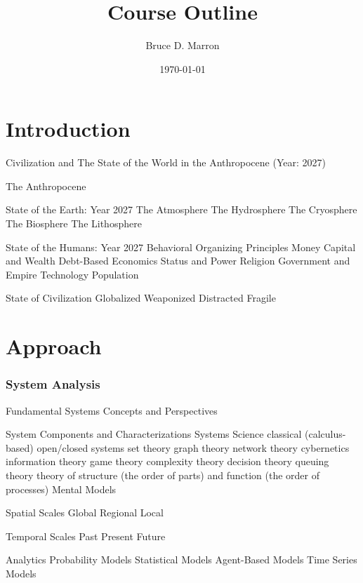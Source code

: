 \documentclass[12pt, letterpaper]{article}
\title{\vspace{-15mm}\fontsize{14pt}{10pt}
                    \selectfont \textbf{Course Outline}   %
                    \vspace{-7mm}
      }
\author{
     \normalsize Bruce D. Marron \\                     %
     \vspace{-5mm}
}
\date{\normalsize \today}
\begin{document}
\begin{singlespacing}
\maketitle                                      %
\end{singlespacing}
\thispagestyle{fancy}                           %


\section{Introduction}
Civilization and The State of the World in the Anthropocene (Year: 2027)
\begin{outline}[enumerate]
\1 The Anthropocene

\1 State of the Earth: Year 2027
\2 The Atmosphere 
\2 The Hydrosphere 
\2 The Cryosphere
\2 The Biosphere
\2 The Lithosphere

\1 State of the Humans: Year 2027
\2 Behavioral Organizing Principles 
\3 Money
\4 Capital and Wealth
\4 Debt-Based Economics
\3 Status and Power
\3 Religion
\3 Government and Empire
\2 Technology
\2 Population

\1 State of Civilization
\2 Globalized
\2 Weaponized
\2 Distracted
\2 Fragile
\end{outline}



\section{Approach}
\subsubsection{System Analysis}
\begin{outline}[enumerate]
\1 Fundamental Systems Concepts and Perspectives


\2 System Components and Characterizations
\2 Systems Science
\3 classical (calculus-based) open/closed systems 
\3 set theory
\3 graph theory
\3 network theory
\3 cybernetics
\3 information theory
\3 game theory
\3 complexity theory
\3 decision theory
\3 queuing theory
\3 theory of structure (the order of parts) and function (the order of processes)
\2 Mental Models


\1 Spatial Scales
\2 Global
\2 Regional
\2 Local

\1 Temporal Scales
\2 Past
\2 Present
\2 Future

\1 Analytics
\2 Probability Models
\2 Statistical Models
\2 Agent-Based Models
\2 Time Series Models

\end{outline}
\end{document}
